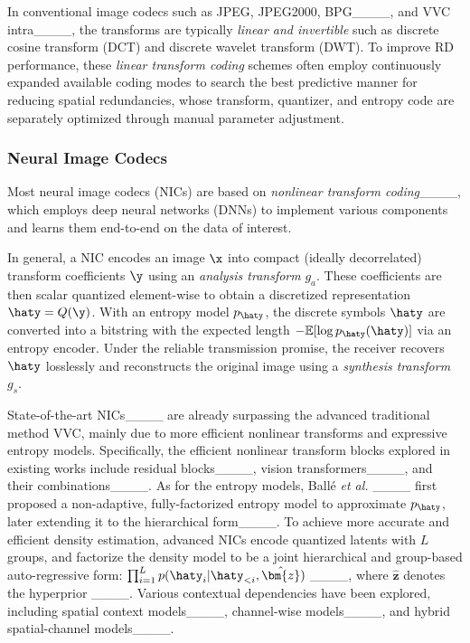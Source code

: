     In conventional image codecs such as JPEG, JPEG2000, BPG____, and VVC intra____, the transforms are typically \emph{linear and invertible} such as discrete cosine transform (DCT) and discrete wavelet transform (DWT). To improve RD performance, these \emph{linear transform coding} schemes often employ continuously expanded available coding modes to search the best predictive manner for reducing spatial redundancies, whose transform, quantizer, and entropy code are separately optimized through manual parameter adjustment.

    \subsubsection{Neural Image Codecs}
    Most neural image codecs (NICs) are based on \emph{nonlinear transform coding}____, which employs deep neural networks (DNNs) to implement various components and learns them end-to-end on the data of interest.
    
	In general, a NIC encodes an image $\x$ into compact (ideally decorrelated) transform coefficients $\y$ using an \emph{analysis transform} $g_a$. These coefficients are then scalar quantized element-wise to obtain a discretized representation $\haty = Q(\y)$. With an entropy model $p_{\haty}$, the discrete symbols $\haty$ are converted into a bitstring with the expected length $-\mathbb{E}[\log p_{\haty}(\haty)]$ via an entropy encoder. 
    Under the reliable transmission promise, the receiver recovers $\haty$ losslessly and reconstructs the original image using a \emph{synthesis transform} $g_s$.	
    
    State-of-the-art NICs____ are already surpassing the advanced traditional method VVC, mainly due to more efficient nonlinear transforms and expressive entropy models. 
    Specifically, the efficient nonlinear transform blocks explored in existing works include residual blocks____, vision transformers____, and their combinations____.
    As for the entropy models, Ballé \emph{et al.} ____ first proposed a non-adaptive, fully-factorized entropy model to approximate $p_{\haty}$, later extending it to the hierarchical form____.
    To achieve more accurate and efficient density estimation, advanced NICs encode quantized latents with $L$ groups, and factorize the density model to be a joint hierarchical and group-based auto-regressive form: $\prod_{i=1}^{L} p(\haty_{i} | \haty_{<i}, \hat{\bm{z}})$ ____, where $\hat{\bm{z}}$ denotes the hyperprior ____. 
    Various contextual dependencies have been explored, including spatial context models____, channel-wise models____, and hybrid spatial-channel models____.
	
